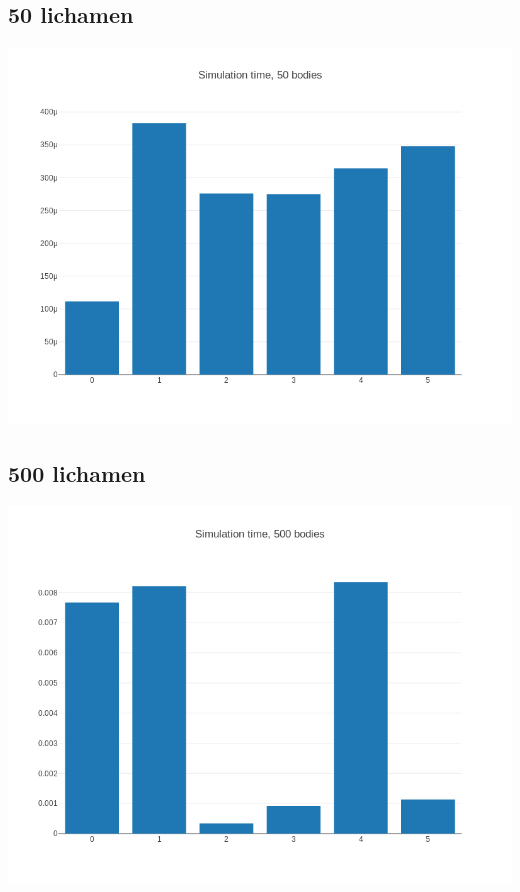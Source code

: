 \documentclass{article}
\begin{document}
\subsection{50 lichamen}
\includegraphics[width=\linewidth]{grafiekskes/hist_simulation50.png}
\subsection{500 lichamen}
\includegraphics[width=\linewidth]{grafiekskes/hist_simulation500.png}
\end{document}
